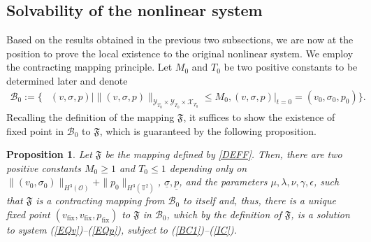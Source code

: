 \documentclass[12pt,reqno]{amsart}
\numberwithin{equation}{section}
\newtheorem{proposition}[theorem]{Proposition}
\begin{document}
\subsection{Solvability of the nonlinear system}
Based on the results obtained in the previous two subsections, we are now at the position to prove the local existence to the original nonlinear system. We employ the contracting mapping principle.
Let $M_0$ and $T_0$ be two positive constants to be determined later and denote
\begin{align*}
\mathscr B_0:=\Big\{&(v,\sigma,p)\Big|\|(v,\sigma,p)\|_{\mathscr Y_{T_0}\times\mathscr Y_{T_0}\times\mathscr X_{T_0}}\leq M_0, (v,\sigma,p)|_{t=0}=(v_0,\sigma_0,p_0)\Big\}.
\end{align*}
Recalling the definition of the mapping $\mathfrak F$, it suffices to show the existence of fixed point in $\mathscr B_0$ to $\mathfrak F$, which is guaranteed by the following proposition.

\begin{proposition}
  \label{PROPA3-1}
Let $\mathfrak F$ be the mapping defined by \eqref{DEFF}. Then, there are two positive constants $M_0\geq1$ and $T_0\leq1$ depending only on $\|(v_0,\sigma_0)\|_{H^3(\mathcal O)}+\|p_0\|_{H^3(\mathbb T^2)}$, $\underline\sigma, \underline p$, and the parameters $\mu, \lambda, \nu, \gamma, \epsilon$, such that $\mathfrak F$ is a contracting mapping from $\mathscr B_0$ to itself and, thus, there is a unique fixed point $(v_\text{fix}, v_\text{fix}, p_\text{fix})$ to $\mathfrak F$ in $\mathscr B_0$, which by the definition of $\mathfrak F$, is a solution to system (\ref{EQv})--(\ref{EQp}),
  subject to (\ref{BC1})--(\ref{IC}).
\end{proposition}
\end{document}
